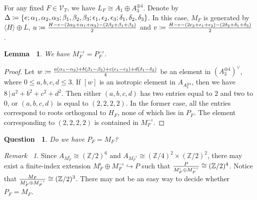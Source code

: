 \documentclass[12pt,reqno,a4paper]{amsart}
\newtheorem{lem}[thm]{Lemma~}
\newtheorem{prop}[thm]{Proposition~}
\newtheorem{ques}[thm]{Question~}
\theoremstyle{remark}
\newtheorem{rmk}[thm]{Remark~}
\theoremstyle{definition}
\newcommand{\ZZ}{\mathbb{Z}}
\newcommand{\calV}{\mathcal{V}}
\begin{document}
For any fixed $F\in\calV_{T}$, we have $L_F\cong A_1\oplus A_3^{\oplus 4}$.
Denote by $\Delta\coloneqq \{ e;\alpha_1,\alpha_2,\alpha_3;\beta_1,\beta_2,\beta_3;\\ \epsilon_1,\epsilon_2,\epsilon_3;\delta_1,\delta_2,\delta_3 \}$.
In this case, $M_F$ is generated by $\langle H\rangle \oplus L$, $u\coloneqq{H-e-(2\alpha_2+\alpha_1+\alpha_3)-(2\beta_2+\beta_1+\beta_3)\over2}$ and $v\coloneqq{H-e-(2\epsilon_2+\epsilon_1+\epsilon_3)-(2\delta_2+\delta_1+\delta_3)\over2}$. 
\begin{lem}
    We have $M_F^{-\iota}=P_F^{-\iota}$.
\end{lem}
\begin{proof}
    Let $w\coloneqq{a(\alpha_1-\alpha_3)+b(\beta_1-\beta_3)+c(\epsilon_1-\epsilon_3)+d(\delta_1-\delta_3)\over4}$ be an element in $(A_3^{\oplus4})^\vee$, where $0\le a,b,c,d\le 3$.
    If $[w]$ is an isotropic element in $A_{A_3^{\oplus4}}$, then we have $8\,|\,a^2+b^2+c^2+d^2$. 
    Then either $(a,b,c,d)$ has two entries equal to $2$ and two to $0$, or $(a,b,c,d)$ is equal to $(2,2,2,2)$. 
    In the former case, all the entries correspond to roots orthogonal to $H_F$, none of which lies in $P_F$.
    The element corresponding to $(2,2,2,2)$ is contained in $M_F^{-\iota}$. 
\end{proof}
\begin{ques}
    Do we have $P_F=M_F$?
\end{ques}
\begin{rmk}
    Since $A_{M_F^{\iota}}\cong(\ZZ/2)^6$ and $A_{M_F^{-\iota}}\cong(\ZZ/4)^2\times(\ZZ/2)^2$, there may exist a finite-index extension $M_F^{\iota}\oplus M_F^{-\iota}\hookrightarrow P$ such that ${P\over M_F^{\iota}\oplus M_F^{-\iota}}\cong(\ZZ/2)^4$.
    Notice that ${M_F\over M_F^{\iota}\oplus M_F^{-\iota}}\cong(\ZZ/2)^3$.
    There may not be an easy way to decide whether $P_F=M_F$.
\end{rmk}
\end{document}
